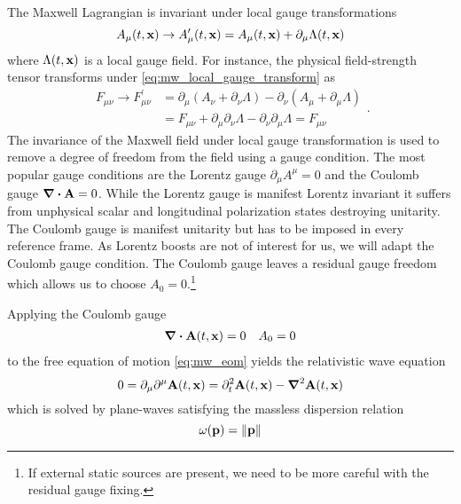 The Maxwell Lagrangian is invariant under local gauge transformations
\begin{equation}
	A_\mu(t,\vb{x})
	\to
	A_\mu^\prime(t,\vb{x})
	=
	A_\mu(t,\vb{x})
	+
	\partial_\mu\Lambda(t,\vb{x})
	\label{eq:mw_local_gauge_transform}
\end{equation}
where $\Lambda(t,\vb{x})$ is a local gauge field.
For instance, the physical field-strength tensor transforms under \cref{eq:mw_local_gauge_transform} as
\begin{equation}
	\begin{split}
		F_{\mu\nu}
		\to
		F_{\mu\nu}^\prime
		&=
		\partial_\mu\left(A_\nu+\partial_\nu\Lambda\right)
		-
		\partial_\nu\left(A_\mu+\partial_\mu\Lambda\right)
		\\
		&=
		F_{\mu\nu}
		+
		\partial_\mu\partial_\nu\Lambda
		-
		\partial_\nu\partial_\mu\Lambda
		=
		F_{\mu\nu}
	\end{split}
	\label{eq:mw_field_strength_gauge_transform}.
\end{equation}
The invariance of the Maxwell field under local gauge transformation is used to remove a degree of freedom from the field using a gauge condition.
The most popular gauge conditions are the Lorentz gauge $\partial_\mu A^\mu=0$ and the Coulomb gauge $\div\vb{A}=0$.
While the Lorentz gauge is manifest Lorentz invariant it suffers from unphysical scalar and longitudinal polarization states destroying unitarity.
The Coulomb gauge is manifest unitarity but has to be imposed in every reference frame.
As Lorentz boosts are not of interest for us, we will adapt the Coulomb gauge condition.
The Coulomb gauge leaves a residual gauge freedom which allows us to choose $A_0=0$.\footnote{If external static sources are present, we need to be more careful with the residual gauge fixing.}

Applying the Coulomb gauge
\begin{align}
	\div\vb{A}(t,\vb{x})
	=
	0
	&&
	A_0
	=
	0
	\label{eq:mw_coulomb_gauge}
\end{align}
to the free equation of motion \cref{eq:mw_eom} yields the relativistic wave equation
\begin{equation}
	0
	=
	\partial_\mu\partial^\mu
	\vb{A}(t,\vb{x})
	=
	\partial_t^2
	\vb{A}(t,\vb{x})
	-
	\grad^2
	\vb{A}(t,\vb{x})
	\label{eq:mw_relatistic_wave}
\end{equation}
which is solved by plane-waves satisfying the massless dispersion relation
\begin{equation}
	\omega(\vb{p})
	=
	\norm{\vb{p}}
\end{equation}

